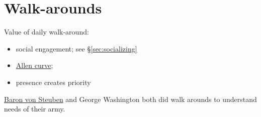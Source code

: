 \section{Walk-arounds}

Value of daily walk-around: 
\begin{itemize}
    \item social engagement; see \S\ref{sec:socializing}
\item \href{https://en.wikipedia.org/wiki/Allen_curve}{Allen curve}; 
\item presence creates priority
\end{itemize}

\href{https://en.wikipedia.org/wiki/Friedrich_Wilhelm_von_Steuben}{Baron von Steuben} and George Washington both did walk arounds to understand needs of their army. 